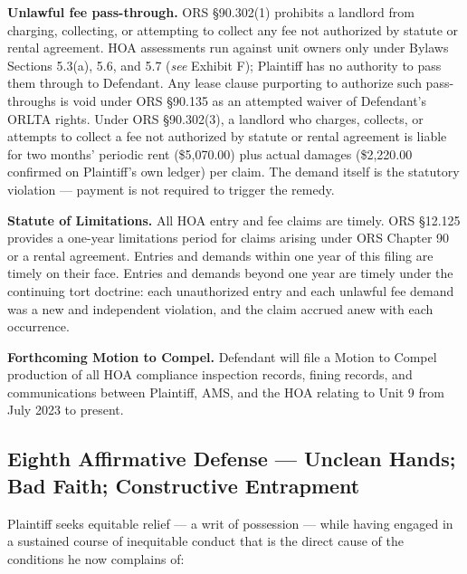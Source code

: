 \documentclass[12pt,letterpaper]{article}
\begin{document}
	\textbf{Unlawful fee pass-through.} ORS \S90.302(1) prohibits a landlord from charging, collecting, or attempting to collect any fee not authorized by statute or rental agreement. HOA assessments run against unit owners only under Bylaws Sections 5.3(a), 5.6, and 5.7 (\textit{see} Exhibit F); Plaintiff has no authority to pass them through to Defendant. Any lease clause purporting to authorize such pass-throughs is void under ORS \S90.135 as an attempted waiver of Defendant's ORLTA rights. Under ORS \S90.302(3), a landlord who charges, collects, or attempts to collect a fee not authorized by statute or rental agreement is liable for two months' periodic rent (\$5,070.00) plus actual damages (\$2,220.00 confirmed on Plaintiff's own ledger) per claim. The demand itself is the statutory violation --- payment is not required to trigger the remedy.
	
	\textbf{Statute of Limitations.} All HOA entry and fee claims are timely. ORS \S12.125 provides a one-year limitations period for claims arising under ORS Chapter 90 or a rental agreement. Entries and demands within one year of this filing are timely on their face. Entries and demands beyond one year are timely under the continuing tort doctrine: each unauthorized entry and each unlawful fee demand was a new and independent violation, and the claim accrued anew with each occurrence.
	
	\textbf{Forthcoming Motion to Compel.} Defendant will file a Motion to Compel production of all HOA compliance inspection records, fining records, and communications between Plaintiff, AMS, and the HOA relating to Unit 9 from July 2023 to present.
	
	\subsection{Eighth Affirmative Defense --- Unclean Hands; Bad Faith; Constructive Entrapment}
	
	Plaintiff seeks equitable relief --- a writ of possession --- while having engaged in a sustained course of inequitable conduct that is the direct cause of the conditions he now complains of:
	
\end{document}
